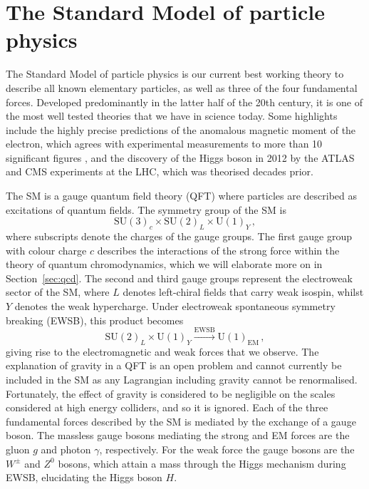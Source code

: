 \documentclass[main.tex]{subfiles}
\begin{document}
\section{The Standard Model of particle physics}
    The Standard Model of particle physics is our current
    best working theory to describe all known elementary particles,
    as well as three of the four fundamental forces. Developed
    predominantly in the latter half of the 20th century, it is
    one of the most well tested theories that we have in science today.
    Some highlights include the highly precise predictions of the
    anomalous magnetic moment of the electron, which agrees with experimental
    measurements to more than 10 significant figures \cite{Aoyama:2017uqe},
    and the discovery of the Higgs boson in 2012 by the ATLAS \cite{ATLAS:2012yve}
    and CMS experiments \cite{CMS:2012qbp} at the LHC,
    which was theorised decades prior.

    The SM is a gauge quantum field theory (QFT) where particles
    are described as excitations of quantum fields. The symmetry group
    of the SM is
    \begin{equation}\label{eqn:SM_gauge}
        \mathrm{SU}(3)_{c} \times \mathrm{SU}(2)_{L} \times \mathrm{U}(1)_{Y}\, ,
    \end{equation}
    where subscripts denote the charges of the gauge groups. The first gauge
    group with colour charge $c$ describes the interactions of the
    strong force within the theory of quantum chromodynamics, which we
    will elaborate more on in Section~\ref{sec:qcd}. The second
    and third gauge groups represent the electroweak sector of the SM, where
    $L$ denotes left-chiral fields that carry weak isospin, whilst $Y$ denotes
    the weak hypercharge. Under electroweak
    spontaneous symmetry breaking (EWSB), this product becomes
    \begin{equation}\label{eqn:SM_SSB}
        \mathrm{SU}(2)_{L} \times \mathrm{U}(1)_{Y} \xrightarrow{\mathrm{EWSB}} \mathrm{U}(1)_{\mathrm{EM}} \, ,
    \end{equation}
    giving rise to the electromagnetic and weak forces that we observe.
    The explanation of gravity in a QFT is an open problem and cannot currently
    be included in the SM as any Lagrangian including gravity cannot be renormalised.
    Fortunately, the effect of gravity is considered
    to be negligible on the scales considered at high energy colliders, and so it is ignored.
    Each of the three fundamental forces described by the SM is mediated
    by the exchange of a gauge boson. The massless gauge bosons mediating the strong
    and EM forces are the gluon $g$ and photon $\gamma$,
    respectively. For the weak force the gauge bosons are the $W^{\pm}$
    and $Z^{0}$ bosons, which attain a mass through the Higgs mechanism \cite{Englert:1964et,Higgs:1964pj,Guralnik:1964eu}
    during EWSB, elucidating the Higgs boson $H$.
\end{document}
